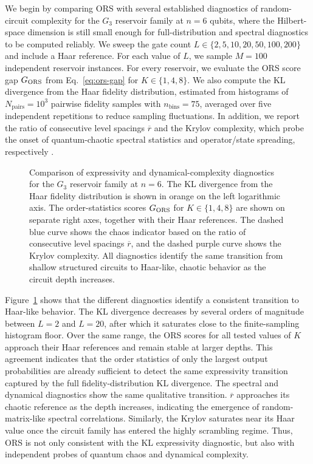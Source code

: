 \documentclass[
    aps,
    pre,
    amsmath,
    amssymb,
    reprint,
    superscriptaddress,
    preprintnumbers,
]{revtex4-2}
\begin{document}
We begin by comparing ORS with several established diagnostics of random-circuit complexity for the $G_3$ reservoir family at $n=6$ qubits, where the Hilbert-space dimension is still small enough for full-distribution and spectral diagnostics to be computed reliably. We sweep the gate count $L \in \{2,5,10,20,50,100,200\}$ and include a Haar reference. For each value of $L$, we sample $M=100$ independent reservoir instances. For every reservoir, we evaluate the ORS score gap $G_{\rm ORS}$ from Eq.~\ref{eq:ors-gap} for $K \in \{1,4,8\}$. We also compute the KL divergence from the Haar fidelity distribution, estimated from histograms of $N_{\mathrm{pairs}}=10^3$ pairwise fidelity samples with $n_{\mathrm{bins}}=75$, averaged over five independent repetitions to reduce sampling fluctuations. In addition, we report the ratio of consecutive level spacings $\overline{r}$ and the Krylov complexity, which probe the onset of quantum-chaotic spectral statistics and operator/state spreading, respectively \cite{domingo2024krylov}.
%
\begin{figure}[t]
\centering

\caption{Comparison of expressivity and dynamical-complexity diagnostics for the $G_3$ reservoir family at $n=6$. The KL divergence from the Haar fidelity distribution is shown in orange on the left logarithmic axis. The order-statistics scores $G_{\rm ORS}$ for $K \in \{1,4,8\}$ are shown on separate right axes, together with their Haar references. The dashed blue curve shows the chaos indicator based on the ratio of consecutive level spacings $\overline{r}$, and the dashed purple curve shows the Krylov complexity. All diagnostics identify the same transition from shallow structured circuits to Haar-like, chaotic behavior as the circuit depth increases.}
\label{fig:KL-ORS}
\end{figure}
%
Figure~\ref{fig:KL-ORS} shows that the different diagnostics identify a consistent transition to Haar-like behavior. The KL divergence decreases by several orders of magnitude between $L=2$ and $L=20$, after which it saturates close to the finite-sampling histogram floor. Over the same range, the ORS scores for all tested values of $K$ approach their Haar references and remain stable at larger depths. This agreement indicates that the order statistics of only the largest output probabilities are already sufficient to detect the same expressivity transition captured by the full fidelity-distribution KL divergence. The spectral and dynamical diagnostics show the same qualitative transition. $\overline{r}$ approaches its chaotic reference as the depth increases, indicating the emergence of random-matrix-like spectral correlations. Similarly, the Krylov saturates near its Haar value once the circuit family has entered the highly scrambling regime. Thus, ORS is not only consistent with the KL expressivity diagnostic, but also with independent probes of quantum chaos and dynamical complexity.
\end{document}
